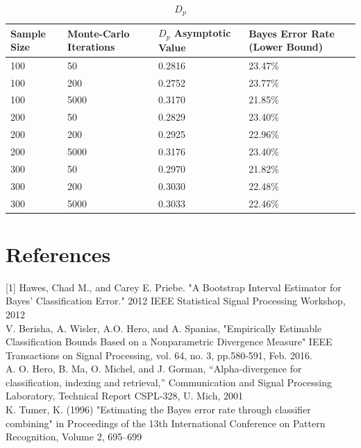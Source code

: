 \documentclass{article}
\begin{document}
		\begin{table}[!h]		
			\caption{$D_p$}
			\begin{center}
				\begin{tabular}[!h]{ |p{3cm}||p{3cm}|p{3cm}|p{3cm}|  }
					
					\hline
					Sample Size & Monte-Carlo Iterations & $D_p$ Asymptotic Value & Bayes Error Rate (Lower Bound) \\ [0.5ex] 
					\hline\hline
					100	& 50	& 0.2816	& 23.47\% \\
					
					\hline
					
					100	& 200	& 0.2752	& 23.77\% \\
					\hline
					
					100	& 5000	& 0.3170	& 21.85\% \\
					
					\hline
					200	& 50	& 0.2829	& 23.40\% \\
					
					\hline
					200	& 200	& 0.2925	& 22.96\% \\
					
					\hline
					200	& 5000  & 0.3176	& 23.40\% \\
					
					\hline
					300	& 50	& 0.2970	& 21.82\% \\
					
					\hline
					300	& 200	& 0.3030	& 22.48\% \\
					\hline
					300	& 5000	& 0.3033	& 22.46\% \\ 
					\hline 		
				\end{tabular}
			\end{center}
		\end{table}			

	\newpage
		\section*{References}
		[1] Hawes, Chad M., and Carey E. Priebe. "A Bootstrap Interval Estimator for Bayes' Classification Error." 2012 IEEE Statistical Signal Processing Workshop, 2012
		\\ [0.5ex]
		\noindent[2] V. Berisha, A. Wisler, A.O. Hero, and A. Spanias, "Empirically Estimable Classification Bounds Based on a Nonparametric Divergence Measure" IEEE Transactions on Signal Processing, vol. 64, no. 3, pp.580-591, Feb. 2016.
		\\ [0.5ex]
		\noindent[3] A. O. Hero, B. Ma, O. Michel, and J. Gorman, “Alpha-divergence for classification, indexing and retrieval,” Communication and Signal Processing Laboratory, Technical Report CSPL-328, U. Mich, 2001
		\\ [0.5ex]
		\noindent [4] K. Tumer, K. (1996) "Estimating the Bayes error rate through classifier combining" in Proceedings of the 13th International Conference on Pattern Recognition, Volume 2, 695–699
		
\end{document}
